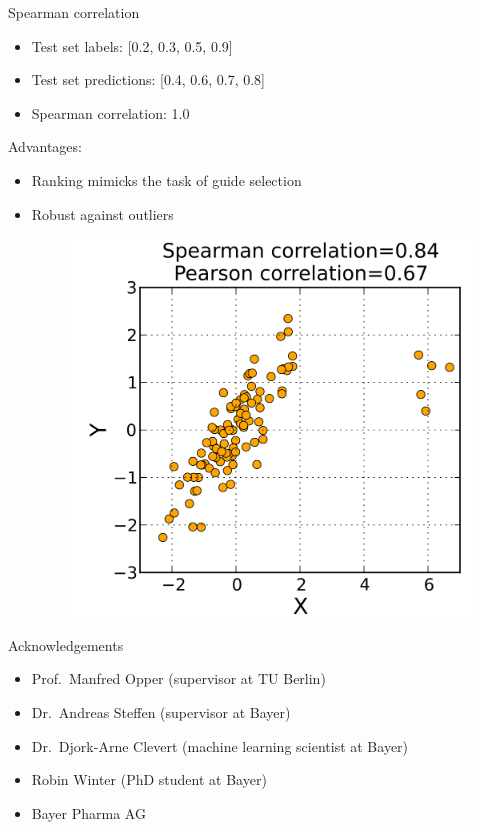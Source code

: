 \documentclass[Nike]{tuberlinbeamer}
\begin{document}
\begin{frame}{Spearman correlation}
  \begin{itemize}
    \item Test set labels: [0.2, 0.3, 0.5, 0.9]
    \item Test set predictions: [0.4, 0.6, 0.7, 0.8]
    \item Spearman correlation: 1.0
  \end{itemize}
  \pause
  \vspace{0.3cm}
  {\large Advantages:}
  \begin{itemize}
    \item Ranking mimicks the task of guide selection
    \pause
    \item Robust against outliers
    \begin{figure}
      \includegraphics[width=0.30\linewidth]{./Spearman2.png}
    \end{figure}
  \end{itemize}
\end{frame}

\begin{frame}{Acknowledgements}
  \begin{itemize}
    \item Prof.\ Manfred Opper (supervisor at TU Berlin)
    \item Dr.\ Andreas Steffen (supervisor at Bayer)
    \item Dr.\ Djork-Arne Clevert (machine learning scientist at Bayer)
    \item Robin Winter (PhD student at Bayer)
    \item Bayer Pharma AG
  \end{itemize}

\end{frame}
\end{document}
